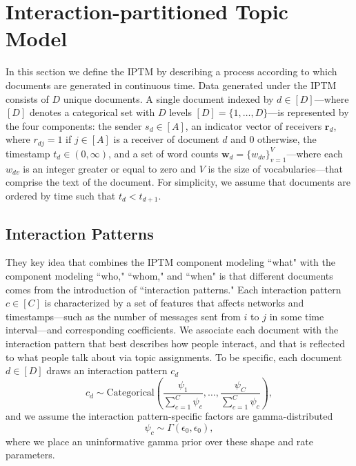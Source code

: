 \documentclass[ba]{imsart}
\numberwithin{equation}{section}
\theoremstyle{plain}
\begin{document}
	\section{Interaction-partitioned Topic Model}\label{sec:generative process}
		In this section we define the IPTM by describing a process according to which documents are generated in continuous time. Data generated under the IPTM consists of $D$ unique documents. A single document indexed by $d \in [D]$---where $[D]$ denotes a categorical set with $D$ levels $[D] = \{1,\ldots,D\}$---is represented by the four components: the sender $s_d \in [A]$, an indicator vector of receivers $\boldsymbol{r}_d$, where $r_{dj}=1$ if $j \in [A]$ is a receiver of document $d$ and 0 otherwise, the timestamp $t_d \in (0, \infty)$, and a set of word counts $\boldsymbol{w}_d= \{w_{dv} \}_{v=1}^{V}$---where each $w_{dv}$ is an integer greater or equal to zero and $V$ is the size of vocabularies---that comprise the text of the document. For simplicity, we assume that documents are ordered by time such that $t_d < t_{d+1}$.~
		
\subsection{Interaction Patterns}\label{subsec:Interaction patterns}
They key idea that combines the IPTM component modeling ``what" with
the component modeling ``who," ``whom," and ``when" is that different
documents comes from the introduction of ``interaction patterns."  Each interaction pattern $c \in [C]$ is characterized by a set of features that affects networks and timestamps---such as the number of messages sent from $i$ to $j$ in some time interval---and corresponding coefficients. We associate each document with the interaction pattern that best describes how people interact, and that is reflected to what people talk about via topic assignments. To be specific, each document $d \in [D]$ draws an interaction pattern $c_d$
\begin{equation}
c_d\sim \mbox{Categorical}(\frac{\psi_1}{\sum_{c=1}^C \psi_c},\ldots,\frac{\psi_C}{\sum_{c=1}^C \psi_c}),
\end{equation}
and we assume the interaction pattern-specific factors are gamma-distributed
\begin{equation}
\psi_c\sim \Gamma(\epsilon_0,\epsilon_0),
\end{equation}
where we place an uninformative gamma prior over these shape and rate parameters.~
\end{document}
